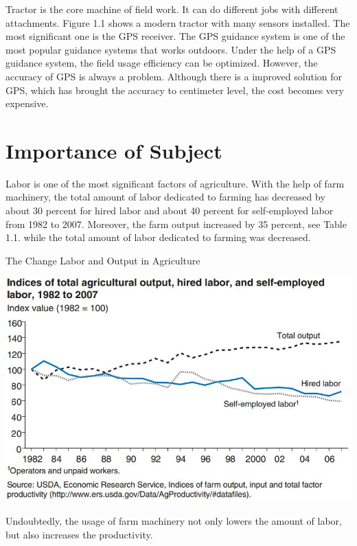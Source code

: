 Tractor is the core machine of field work. It can do different jobs with different attachments. Figure  1.1 shows a modern tractor with many sensors installed. The most significant one is the GPS receiver. The GPS guidance system is one of the most popular guidance systems that works outdoors. Under the help of a GPS guidance system, the field usage efficiency can be optimized. However, the accuracy of GPS is always a problem. Although there is a improved solution for GPS, which has brought the accuracy to centimeter level, the cost becomes very expensive.

\section{Importance of Subject}

Labor is one of the most significant factors of agriculture. With the help of farm machinery, the total amount of labor dedicated to farming has decreased by about 30 percent for hired labor and about 40 percent for self-employed labor from 1982 to 2007. Moreover, the farm output increased by 35 percent, see Table 1.1. while the total amount of labor dedicated to farming was decreased. \cite{o2011changing} %
\begin{table}[ht!]
\begin{center}
\caption{The Change Labor and Output in Agriculture}
\includegraphics[scale = 0.7]{pics/laborandoutput.jpg}
\end{center}
\end{table}
Undoubtedly, the usage of farm machinery not only lowers the amount of labor, but also increases the productivity. 

